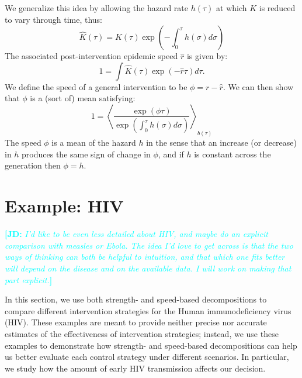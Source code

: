 \documentclass[12pt]{article}\usepackage[]{graphicx}\usepackage[]{color}
\newcommand{\comment}[3]{\textcolor{#1}{\textbf{[#2: }\textit{#3}\textbf{]}}}
\newcommand{\jd}[1]{\comment{cyan}{JD}{#1}}
\begin{document}
We generalize this idea by allowing the hazard rate $h(\tau)$ at which $K$ is reduced to vary through time, thus:
\begin{equation}
	\hat K(\tau) = K(\tau) \exp\left(-\int_0^\tau h(\sigma) d\sigma\right)
\end{equation}
The associated post-intervention epidemic speed $\hat r$ is given by:
\begin{equation}
	1 = \int \hat K(\tau) \exp(-\hat r\tau) d\tau.	
\end{equation}
We define the speed of a general intervention to be $\phi = r - \hat r$. 
We can then show that $\phi$ is a (sort of) mean satisfying:
\begin{equation}
	1 = \left\langle \frac{\exp(\phi \tau) }{\exp\left(\int_0^\tau h(\sigma) d\sigma\right)} \right\rangle_{b(\tau)}
\end{equation}
The speed $\phi$ is a mean of the hazard $h$ in the sense that an increase (or decrease) in $h$ produces the same sign of change in $\phi$, and if $h$ is constant across the generation then $\phi=h$.

\section{Example: HIV}

\jd{I'd like to be even less detailed about HIV, and maybe do an explicit comparison with measles or Ebola. The idea I'd love to get across is that the two ways of thinking can both be helpful to intuition, and that which one fits better will depend on the disease and on the available data. I will work on making that part explicit.}

In this section, we use both strength- and speed-based decompositions to compare different intervention strategies for the Human immunodeficiency virus (HIV). 
These examples are meant to provide neither precise nor accurate estimates of the effectiveness of intervention strategies; 
instead, we use these examples to demonstrate how strength- and speed-based decompositions can help us better evaluate each control strategy under different scenarios.
In particular, we study how the amount of early HIV transmission affects our decision.
\end{document}

